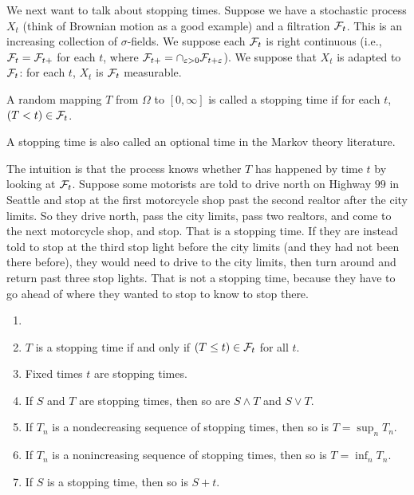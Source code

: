 
We next want to talk about stopping times. Suppose we have a stochastic process $X_t$ (think of Brownian motion as a good example) and a filtration $\mathcal{F}_t$. This is an increasing collection of $\sigma$-fields. We suppose each $\mathcal{F}_t$ is right continuous (i.e., $\mathcal{F}_t = \mathcal{F}_{t+}$ for each $t$, where $\mathcal{F}_{t+} = \cap_{\varepsilon>0}\mathcal{F}_{t+\varepsilon}$). We suppose that $X_t$ is adapted to $\mathcal{F}_t$: for each $t$, $X_t$ is $\mathcal{F}_t$ measurable.

\begin{definition}\label{def:ch1_2.5}
A random mapping $T$ from $\Omega$ to $[0,\infty]$ is called a stopping time if for each $t$, $(T < t) \in \mathcal{F}_t$.
\end{definition}

A stopping time is also called an optional time in the Markov theory literature.

The intuition is that the process knows whether $T$ has happened by time $t$ by looking at $\mathcal{F}_t$. Suppose some motorists are told to drive north on Highway $99$ in Seattle and stop at the first motorcycle shop past the second realtor after the city limits. So they drive north, pass the city limits, pass two realtors, and come to the next motorcycle shop, and stop. That is a stopping time. If they are instead told to stop at the third stop light before the city limits (and they had not been there before), they would need to drive to the city limits, then turn around and return past three stop lights. That is not a stopping time, because they have to go ahead of where they wanted to stop to know to stop there.

\begin{proposition}\label{prop:ch1_2.6}
\begin{enumerate}
    \item[]
    \item $T$ is a stopping time if and only if $(T \leq t) \in \mathcal{F}_t$ for all $t$.
    \item Fixed times $t$ are stopping times.
    \item If $S$ and $T$ are stopping times, then so are $S \wedge T$ and $S \vee T$.
    \item If $T_n$ is a nondecreasing sequence of stopping times, then so is $T = \sup_n T_n$.
    \item If $T_n$ is a nonincreasing sequence of stopping times, then so is $T = \inf_n T_n$.
    \item If $S$ is a stopping time, then so is $S + t$.
\end{enumerate}
\end{proposition}


